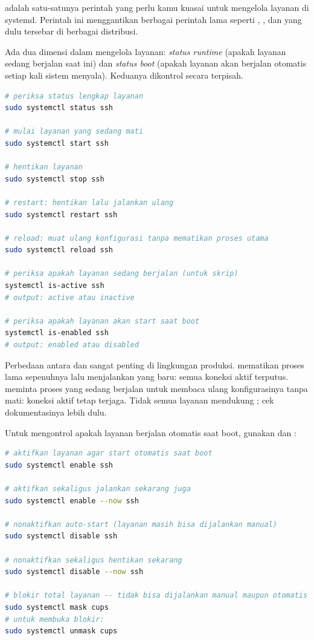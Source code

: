  adalah satu-satunya perintah yang perlu kamu kuasai untuk mengelola layanan di systemd. Perintah ini menggantikan berbagai perintah lama seperti , , dan  yang dulu tersebar di berbagai distribusi.

Ada dua dimensi dalam mengelola layanan: \textit{status runtime} (apakah layanan sedang berjalan saat ini) dan \textit{status boot} (apakah layanan akan berjalan otomatis setiap kali sistem menyala). Keduanya dikontrol secara terpisah.

\begin{lstlisting}[language=bash, caption={Perintah dasar systemctl untuk runtime layanan}]
# periksa status lengkap layanan
sudo systemctl status ssh

# mulai layanan yang sedang mati
sudo systemctl start ssh

# hentikan layanan
sudo systemctl stop ssh

# restart: hentikan lalu jalankan ulang
sudo systemctl restart ssh

# reload: muat ulang konfigurasi tanpa mematikan proses utama
sudo systemctl reload ssh

# periksa apakah layanan sedang berjalan (untuk skrip)
systemctl is-active ssh
# output: active atau inactive

# periksa apakah layanan akan start saat boot
systemctl is-enabled ssh
# output: enabled atau disabled
\end{lstlisting}

Perbedaan antara  dan  sangat penting di lingkungan produksi.  mematikan proses lama sepenuhnya lalu menjalankan yang baru: semua koneksi aktif terputus.  meminta proses yang sedang berjalan untuk membaca ulang konfigurasinya tanpa mati: koneksi aktif tetap terjaga. Tidak semua layanan mendukung ; cek dokumentasinya lebih dulu.

Untuk mengontrol apakah layanan berjalan otomatis saat boot, gunakan  dan :

\begin{lstlisting}[language=bash, caption={Mengontrol auto-start layanan saat boot}]
# aktifkan layanan agar start otomatis saat boot
sudo systemctl enable ssh

# aktifkan sekaligus jalankan sekarang juga
sudo systemctl enable --now ssh

# nonaktifkan auto-start (layanan masih bisa dijalankan manual)
sudo systemctl disable ssh

# nonaktifkan sekaligus hentikan sekarang
sudo systemctl disable --now ssh

# blokir total layanan -- tidak bisa dijalankan manual maupun otomatis
sudo systemctl mask cups
# untuk membuka blokir:
sudo systemctl unmask cups
\end{lstlisting}

